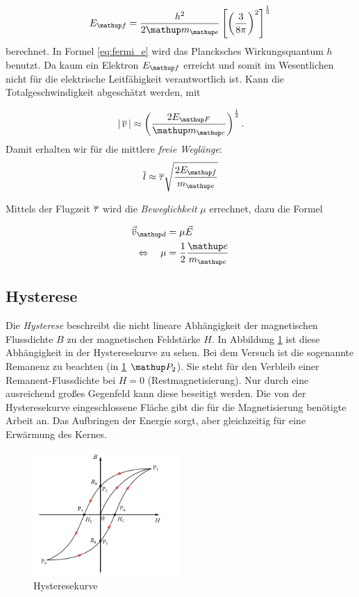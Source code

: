 \begin{equation}
\label{eq:fermi_e}
E\ua{f}=\frac{h^2}{2\map{m}\ua{e}}\left[\left(\frac{3}{8\pi}\right)^2\right]^{\frac{1}{3}}
\end{equation}
berechnet. In Formel \eqref{eq:fermi_e} wird das Plancksches Wirkungsquantum $h$ benutzt.
Da kaum ein Elektron $E\ua{f}$ erreicht und somit im Wesentlichen nicht 
für die elektrische Leitfähigkeit verantwortlich ist.
Kann die Totalgeschwindigkeit abgeschätzt werden, mit

\begin{equation}
\label{eq:total_v}
\left|\,\overline{v}\,\right|\approx\left(\frac{2E\ua{F}}{\map{m}\ua{e}}\right)^{\frac{1}{2}}.
\end{equation}
Damit erhalten wir für die  mittlere \emph{freie Weglänge}:
\begin{equation}
\label{eq:mit_frei_weg}
\overline{l}\approx\overline{\tau}\sqrt{\frac{2E\ua{f}}{m\ua{e}}}
\end{equation}

Mittels der Flugzeit $\overline{\tau}$ wird die \emph{Beweglichkeit} $\mu$ errechnet,
dazu die Formel 

\begin{align}
\vec{\ov{v}}\ua{d}&=\mu\vec{E} \notag \\ 
\Leftrightarrow \quad \mu&=\frac{1}{2}\frac{\map{e}}{m\ua{e}} \label{eq:beweg}
\end{align}

\subsection{Hysterese} 

Die \emph{Hysterese} beschreibt die nicht lineare 
Abhängigkeit der magnetischen Flussdichte $B$ zu der 
magnetischen Feldstärke $H$. In Abbildung \ref{fig: hyste} ist 
diese Abhängigkeit in der Hysteresekurve zu sehen. 
Bei dem Versuch ist die sogenannte Remanenz zu beachten (in \ref{fig: hyste} $\map{P}_2$).
Sie steht für den Verbleib einer Remanent-Flussdichte bei $H=0$ (Restmagnetisierung).
Nur durch eine ausreichend großes Gegenfeld kann diese beseitigt werden.
Die von der Hysteresekurve eingeschlossene Fläche gibt die für die Magnetisierung benötigte
Arbeit an. Das Aufbringen der Energie sorgt, aber gleichzeitig für eine Erwärmung des Kernes.

\begin{figure}
  \centering
  \includegraphics[width=0.5\textwidth]{pics/hystereskurve.png}
  \caption{Hysteresekurve \cite{hyste}}
  \label{fig: hyste}
\end{figure}
